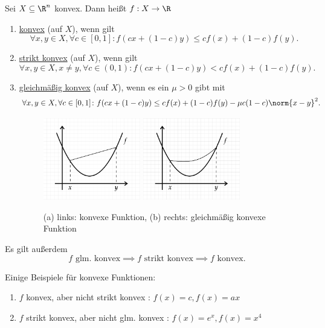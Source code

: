 \begin{definition}
\label{thm:konvexfunktion}
	Sei $X \subseteq \R^{n}$ konvex. Dann heißt $f:X \rightarrow \R$
	\begin{enumerate}[label=\alph{enumi})]
		\item \underline{konvex} (auf $X$), wenn gilt
			\[
				\forall x,y \in X, \forall c \in [0,1] \colon f(cx + (1-c)y) \leq cf(x) + (1-c)f(y)
			.\] 
		\item \underline{strikt konvex} (auf $X$), wenn gilt
			\[
				\forall x,y \in X, x \neq y, \forall c \in (0,1) \colon f(cx + (1-c)y) < cf(x) + (1-c)f(y)
			.\] 
		\item \underline{gleichmäßig konvex} (auf $X$), wenn es ein $\mu>0$ gibt mit
			\[
				\forall x,y \in X, \forall c \in [0,1] \colon f(cx+ (1-c)y) \leq cf(x) + (1-c)f(y) - \mu c(1-c) \norm{x-y}^{2}
			.\] 
			\begin{figure}[ht!]
			\begin{center}
				\includegraphics[width=0.40\textwidth]{pics/texplot1.png} 
				\includegraphics[width=0.4\textwidth]{pics/texplot2.png}
			\end{center}
			\caption{(a) links: konvexe Funktion, (b) rechts: gleichmäßig konvexe Funktion}
			\label{fig:gleichmäßigkonvexefunktion}
			\end{figure}
			
	\end{enumerate}
	Es gilt außerdem
	\[
	f \text{ glm. konvex} \implies f \text{ strikt konvex} \implies f \text{ konvex}
	.\] 
\end{definition}

\begin{beispiel}
\label{thm:bspkonvexfunktion1}

Einige Beispiele für konvexe Funktionen:
\begin{itemize}
	\begin{enumerate}[label=\alph{enumi})]
		\item $f$ konvex, aber nicht strikt konvex : $f(x)=c, f(x)=ax$
		\item $f$ strikt konvex, aber nicht glm. konvex : $f(x)=e^{x}, f(x)= x^{4}$
	\end{enumerate}
\end{itemize}
\end{beispiel}

